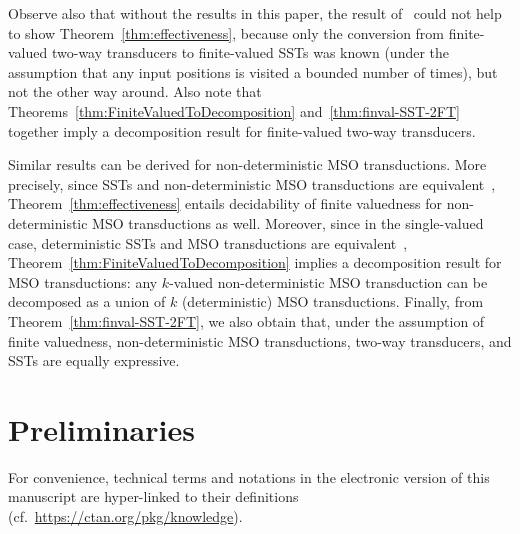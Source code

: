 \documentclass{article}
\begin{document}
    Observe also that without the results in this paper, the result
    of~\cite{YenY22}   could not help to show
    Theorem~\ref{thm:effectiveness}, because 
    only the
    conversion from finite-valued two-way transducers to finite-valued SSTs was
    known (under the assumption that any input positions is visited a
    bounded number of times),
    but not the other way around. %
    Also note that Theorems~\ref{thm:FiniteValuedToDecomposition}
    and~\ref{thm:finval-SST-2FT} together
    imply a
    decomposition result for finite-valued two-way transducers.

    Similar results can be derived for non-deterministic MSO transductions. 
    More precisely, since SSTs and non-deterministic 
    MSO transductions are equivalent~\cite{DBLP:conf/icalp/AlurD11},
    Theorem~\ref{thm:effectiveness} entails decidability of
    finite valuedness for non-deterministic 
    MSO transductions as well. Moreover, since in the single-valued case, 
    deterministic SSTs
    and MSO transductions are equivalent~\cite{DBLP:conf/fsttcs/AlurC10}, 
    Theorem~\ref{thm:FiniteValuedToDecomposition} implies a decomposition result for 
    MSO transductions: any $k$-valued non-deterministic 
    MSO transduction can be decomposed as a union of $k$ (deterministic) 
    MSO transductions. Finally, from Theorem~\ref{thm:finval-SST-2FT}, we
    also obtain that, under the assumption of finite valuedness, 
    non-deterministic MSO transductions, 
    two-way transducers, and SSTs are equally expressive.

  




\section{Preliminaries}\label{sec:preliminaries}


For convenience, technical terms and notations in the
electronic version of this manuscript are hyper-linked to their 
definitions (cf.~\url{https://ctan.org/pkg/knowledge}).
\end{document}

